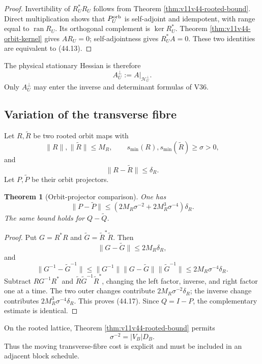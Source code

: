 \documentclass[11pt]{article}
\newtheorem{theorem}{Theorem}[section]
\begin{document}
\begin{proof}
Invertibility of \(R_U^*R_U\) follows from Theorem
\ref{thm:v11v44-rooted-bound}.  Direct multiplication shows that
\(P_U^{\rm orb}\) is self-adjoint and idempotent, with range equal to
\(\operatorname{ran}R_U\).  Its orthogonal complement is
\(\ker R_U^*\).  Theorem \ref{thm:v11v44-orbit-kernel} gives
\(AR_U=0\); self-adjointness gives \(R_U^*A=0\).  These two identities
are equivalent to (44.13).
\end{proof}

The physical stationary Hessian is therefore
\[
 A_U^\perp
 :=
 A|_{\mathcal H_U^\perp}.
 \tag{44.14}
\]
Only \(A_U^\perp\) may enter the inverse and determinant formulas of
V36.

\subsection{Variation of the transverse fibre}

Let \(R,\widetilde R\) be two rooted orbit maps with
\[
 \|R\|,\|\widetilde R\|\leq M_R,\qquad
 s_{\min}(R),s_{\min}(\widetilde R)\geq\sigma>0,
 \tag{44.15}
\]
and
\[
 \|R-\widetilde R\|\leq\delta_R.
 \tag{44.16}
\]
Let \(P,\widetilde P\) be their orbit projectors.

\begin{theorem}[Orbit-projector comparison]
\label{thm:v11v44-projector-comparison}
One has
\[
 \|P-\widetilde P\|
 \leq
 \left(
 2M_R\sigma^{-2}
 +2M_R^3\sigma^{-4}
 \right)\delta_R.
 \tag{44.17}
\]
The same bound holds for \(Q-\widetilde Q\).
\end{theorem}

\begin{proof}
Put \(G=R^*R\) and
\(\widetilde G=\widetilde R^*\widetilde R\).  Then
\[
 \|G-\widetilde G\|
 \leq2M_R\delta_R,
 \tag{44.18}
\]
and
\[
 \|G^{-1}-\widetilde G^{-1}\|
 \leq
 \|G^{-1}\|\|G-\widetilde G\|
 \|\widetilde G^{-1}\|
 \leq2M_R\sigma^{-4}\delta_R.
 \tag{44.19}
\]
Subtract
\(RG^{-1}R^*\) and
\(\widetilde R\widetilde G^{-1}\widetilde R^*\), changing the left
factor, inverse, and right factor one at a time.  The two outer changes
contribute \(2M_R\sigma^{-2}\delta_R\); the inverse change contributes
\(2M_R^3\sigma^{-4}\delta_R\).  This proves (44.17).
Since \(Q=I-P\), the complementary estimate is identical.
\end{proof}

On the rooted lattice, Theorem \ref{thm:v11v44-rooted-bound} permits
\[
 \sigma^{-2}=|V_B|D_B.
 \tag{44.20}
\]
Thus the moving transverse-fibre cost is explicit and must be included
in an adjacent block schedule.
\end{document}
